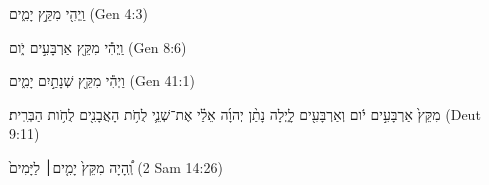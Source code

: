 
\begin{exe}

\ex\label{post_MQC_exs1}
\texthebrew{
וַֽיְהִ֖י מִקֵּ֣ץ יָמִ֑ים 
} (Gen 4:3)

\ex\label{post_MQC_exs2}
\texthebrew{
וַֽיְהִ֕י מִקֵּ֖ץ אַרְבָּעִ֣ים יֹ֑ום 
} (Gen 8:6)

\ex\label{post_MQC_exs3}
\texthebrew{
וַיְהִ֕י מִקֵּ֖ץ שְׁנָתַ֣יִם יָמִ֑ים 
} (Gen 41:1)

\ex\label{post_MQC_exs4}
\texthebrew{
מִקֵּץ֙ אַרְבָּעִ֣ים יֹ֔ום וְאַרְבָּעִ֖ים לָ֑יְלָה נָתַ֨ן יְהוָ֜ה אֵלַ֗י אֶת־שְׁנֵ֛י לֻחֹ֥ת הָאֲבָנִ֖ים לֻחֹ֥ות הַבְּרִֽית׃ 
} (Deut 9:11)

\ex\label{post_MQC_exs5}
\texthebrew{
וְֽ֠הָיָה מִקֵּץ֙ יָמִ֤ים׀ לַיָּמִים֙ 
} (2 Sam 14:26)

\end{exe}
